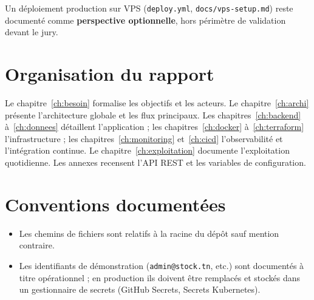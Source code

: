 Un déploiement production sur VPS (\texttt{deploy.yml}, \texttt{docs/vps-setup.md}) reste documenté comme \textbf{perspective optionnelle}, hors périmètre de validation devant le jury.

\section{Organisation du rapport}

Le chapitre~\ref{ch:besoin} formalise les objectifs et les acteurs. Le chapitre~\ref{ch:archi} présente l'architecture globale et les flux principaux. Les chapitres~\ref{ch:backend} à~\ref{ch:donnees} détaillent l'application ; les chapitres~\ref{ch:docker} à~\ref{ch:terraform} l'infrastructure ; les chapitres~\ref{ch:monitoring} et~\ref{ch:cicd} l'observabilité et l'intégration continue. Le chapitre~\ref{ch:exploitation} documente l'exploitation quotidienne. Les annexes recensent l'API REST et les variables de configuration.

\section{Conventions documentées}

\begin{itemize}
  \item Les chemins de fichiers sont relatifs à la racine du dépôt sauf mention contraire.
  \item Les identifiants de démonstration (\texttt{admin@stock.tn}, etc.) sont documentés à titre opérationnel ; en production ils doivent être remplacés et stockés dans un gestionnaire de secrets (GitHub Secrets, Secrets Kubernetes).
\end{itemize}
